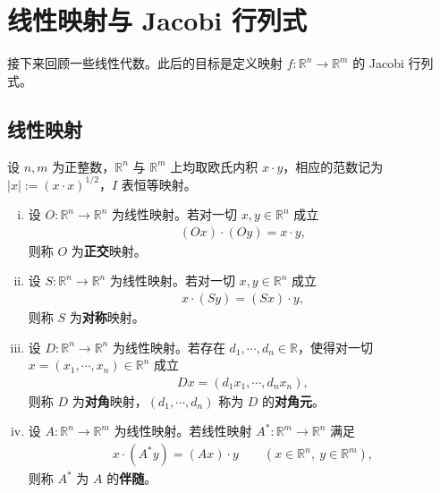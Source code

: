 \documentclass[../../main.tex]{subfiles}%
\begin{document}
\section{线性映射与 Jacobi 行列式}\label{section:ch03-02}


接下来回顾一些线性代数。此后的目标是定义映射 $f:\mathbb{R}^n\to\mathbb{R}^m$ 的 Jacobi 行列式。

\subsection{线性映射}\label{subsection:ch03-02-1}

\begin{definition}[正交、对称、对角映射与伴随]\label{definition:ch03-3-3}
设 $n,m$ 为正整数，$\mathbb{R}^n$ 与 $\mathbb{R}^m$ 上均取欧氏内积 $x\cdot y$，相应的范数记为 $\lvert x\rvert:=(x\cdot x)^{1/2}$，$I$ 表恒等映射。
\begin{enumerate}[(i)]
\item 设 $O:\mathbb{R}^n\to\mathbb{R}^n$ 为线性映射。若对一切 $x,y\in\mathbb{R}^n$ 成立
\begin{align*}
(Ox)\cdot(Oy)=x\cdot y,
\end{align*}
则称 $O$ 为\textbf{正交}映射。
\item 设 $S:\mathbb{R}^n\to\mathbb{R}^n$ 为线性映射。若对一切 $x,y\in\mathbb{R}^n$ 成立
\begin{align*}
x\cdot(Sy)=(Sx)\cdot y,
\end{align*}
则称 $S$ 为\textbf{对称}映射。
\item 设 $D:\mathbb{R}^n\to\mathbb{R}^n$ 为线性映射。若存在 $d_1,\cdots,d_n\in\mathbb{R}$，使得对一切 $x=(x_1,\cdots,x_n)\in\mathbb{R}^n$ 成立
\begin{align*}
Dx=(d_1x_1,\cdots,d_nx_n),
\end{align*}
则称 $D$ 为\textbf{对角}映射，$(d_1,\cdots,d_n)$ 称为 $D$ 的\textbf{对角元}。
\item 设 $A:\mathbb{R}^n\to\mathbb{R}^m$ 为线性映射。若线性映射 $A^*:\mathbb{R}^m\to\mathbb{R}^n$ 满足
\begin{align*}
x\cdot(A^*y)=(Ax)\cdot y\qquad(x\in\mathbb{R}^n,\ y\in\mathbb{R}^m),
\end{align*}
则称 $A^*$ 为 $A$ 的\textbf{伴随}。
\end{enumerate}
\end{definition}
\end{document}
